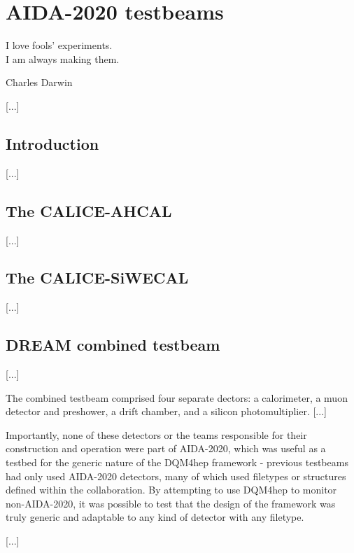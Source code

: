 \chapter{AIDA-2020 testbeams}

\epigraph{I love fools' experiments. \\I am always making them.}{Charles Darwin}

[...]

\section{Introduction}
[...]

\section{The CALICE-AHCAL}
[...]

\section{The CALICE-SiWECAL}
[...]

\section{DREAM combined testbeam}
[...]

The combined testbeam comprised four separate dectors: a calorimeter, a muon detector and preshower, a drift chamber, and a silicon photomultiplier. [...]

Importantly, none of these detectors or the teams responsible for their construction and operation were part of AIDA-2020, which was useful as a testbed for the generic nature of the DQM4hep framework - previous testbeams had only used AIDA-2020 detectors, many of which used filetypes or structures defined within the collaboration. By attempting to use DQM4hep to monitor non-AIDA-2020, it was possible to test that the design of the framework was truly generic and adaptable to any kind of detector with any filetype.

[...]